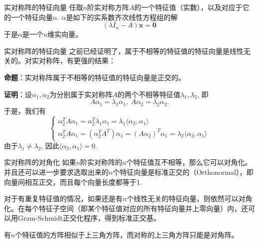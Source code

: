 \documentclass[10pt]{beamer}
\begin{document}

\begin{frame}

\begin{block}{实对称阵的特征向量}
任取$n$阶实对称方阵$A$的一个特征值（实数），以及对应于它的一个特征向量$\alpha$. $\alpha$是如下的实系数齐次线性方程组的解
$$(\lambda I_n - A)\mathbf{x} = \mathbf{0}$$
于是$\alpha$是一个$n$维实向量。
\end{block}

\end{frame}


\begin{frame}

\begin{block}{实对称阵的特征向量}
之前已经证明了，属于不相等的特征值的特征向量是线性无关的。对实对称阵，有更强的结果：

\vspace{1em}
\pause

{\bfseries 命题}：实对称阵属于不相等的特征值的特征向量是正交的。

\vspace{1em}
\pause

{\bfseries 证明}：设$\alpha_1, \alpha_2$为分别属于实对称阵$A$的两个不相等特征值$\lambda_1, \lambda_2$, 即
$$A\alpha_1 = \lambda_1\alpha_1, \; A\alpha_2 = \lambda_2\alpha_2.$$
于是，我们有
$$\begin{cases}
\alpha_2^T A\alpha_1 = \alpha_2^T\lambda_1\alpha_1 = \lambda_1 \langle \alpha_2, \alpha_1 \rangle \\
\alpha_2^T A\alpha_1 = (\alpha_2^T A^T)\alpha_1 = (A\alpha_2)^T\alpha_1 = \lambda_2 \langle \alpha_2, \alpha_1 \rangle
\end{cases}$$
由于$\lambda_1 \neq \lambda_2$, 因此$\langle \alpha_2, \alpha_1 \rangle = 0.$
\end{block}

\end{frame}


\begin{frame}

\begin{block}{实对称阵的对角化}
如果$n$阶实对称阵的$n$个特征值互不相等，那么它可以对角化。并且还可以进一步要求选取出来的$n$个特征向量是标准正交的（Orthonormal），即向量间相互正交，而且每个向量长度都等于1.

\vspace{1em}
\pause

对于有重复特征值的情况，如果还是有$n$个线性无关的特征向量，则依然可以对角化。在每个特征子空间（即某个特征值对应的所有特征向量并上零向量）内，还可以用Gram-Schmidt正交化程序，得到标准正交基。

\vspace{1em}
\pause

有$n$个特征值的方阵相似于上三角方阵，而对称的上三角方阵只能是对角阵。
\end{block}

\end{frame}
\end{document}
